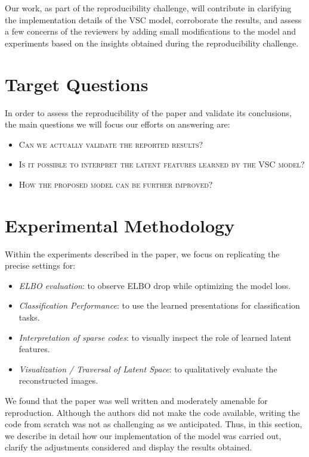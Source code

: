 Our work, as part of the reproducibility challenge, will contribute in clarifying the implementation details of the VSC model, corroborate the results, and assess a few concerns of the reviewers by adding small modifications to the model and experiments based on the insights obtained during the reproducibility challenge.

\section{Target Questions}

In order to assess the reproducibility of the paper and validate its conclusions, the main questions we will focus our efforts on answering are:
\begin{itemize}
    \item \textsc{Can we actually validate the reported results? }
    \item \textsc{Is it possible to interpret the latent features learned by the VSC model?}
    \item \textsc{How the proposed model can be further improved? }
\end{itemize}
 
\section{Experimental Methodology}
\label{experiments}

Within the experiments described in the paper, we focus on replicating the precise settings for:
\begin{itemize}
    \item \textit{ELBO evaluation}: to observe ELBO drop while optimizing the model loss.
    \item \textit{Classification Performance}: to use the learned presentations for classification tasks.
    \item \textit{Interpretation of sparse codes}: to visually inspect the role of learned latent features.
    \item \textit{Visualization / Traversal of Latent Space}: to qualitatively evaluate the reconstructed images. 
\end{itemize}

We found that the paper was well written and moderately amenable for reproduction. Although the authors did not make the code available, writing the code from scratch was not as challenging as we anticipated. Thus, in this section, we describe in detail how our implementation of the model was carried out, clarify the adjustments considered and display the results obtained.

